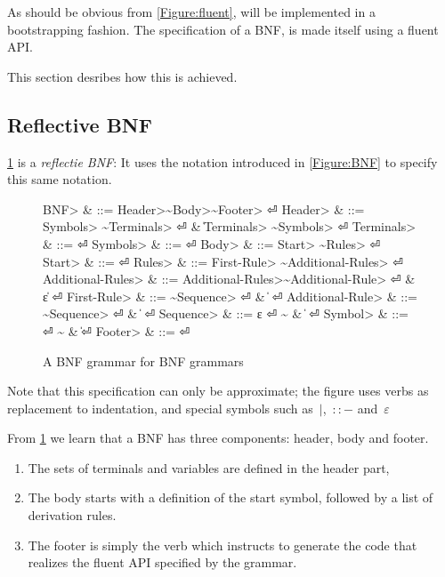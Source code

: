 As should be obvious from \cref{Figure:fluent}, \SELF will be implemented
  in a bootstrapping fashion.
The specification of a BNF, is made itself using a fluent API.


This section desribes how this is achieved.

\subsection{Reflective BNF}
\cref{Figure:BNF:BNF} is a \emph{reflectie BNF}:
It uses the notation introduced in \cref{Figure:BNF}
  to specify this same notation.


\begin{figure}[H]
  \begin{Grammar}
    \begin{aligned}
      \<BNF> & ::= \<Header>\~\<Body>\~\<Footer> \hfill⏎
      \<Header> & ::= \<Symbols> \~\<Terminals> \hfill⏎
      {} & \| \<Terminals> \~\<Symbols> \hfill⏎
      \<Terminals> & ::= \hfill⏎
      \<Symbols> & ::= \hfill⏎
      \<Body> & ::= \<Start> \~\<Rules> \hfill⏎
      \<Start> & ::=  \hfill⏎
      \<Rules> & ::= \<First-Rule> \~\<Additional-Rules> \hfill⏎
      \<Additional-Rules> & ::= \<Additional-Rules>\~\<Additional-Rule> \hfill⏎
      {} & \| ε \hfill⏎
      \<First-Rule> & ::= \~\<Sequence> \hfill⏎
      {} & \|  \hfill⏎
      \<Additional-Rule> & ::= \~\<Sequence> \hfill⏎
      {} & \|  \hfill⏎
      \<Sequence> & ::= ε \hfill⏎
      {\~} & \|  \hfill⏎
      \<Symbol> & ::=  \hfill⏎
      {\~} & \| \hfill⏎
      \<Footer> & ::= \hfill⏎
    \end{aligned}
  \end{Grammar}
  \caption{A BNF grammar for BNF grammars}
  \label{Figure:BNF:BNF}
\end{figure}

Note that this specification can only be approximate;
  the figure uses verbs as replacement to indentation,
  and special symbols such as~$|$,~$::-$ and~$ε$

From \cref{Figure:BNF:BNF} we learn 
  that a BNF has three components: header, body and footer.
  \begin{enumerate}
    \item The sets of terminals and variables are defined in the header part, 
    \item The body starts with a definition of the start symbol, followed by a list of derivation
  rules. 
\item The footer is simply the verb  which instructs \SELF
  to generate the code that realizes the fluent API specified by the grammar.
  \end{enumerate}

